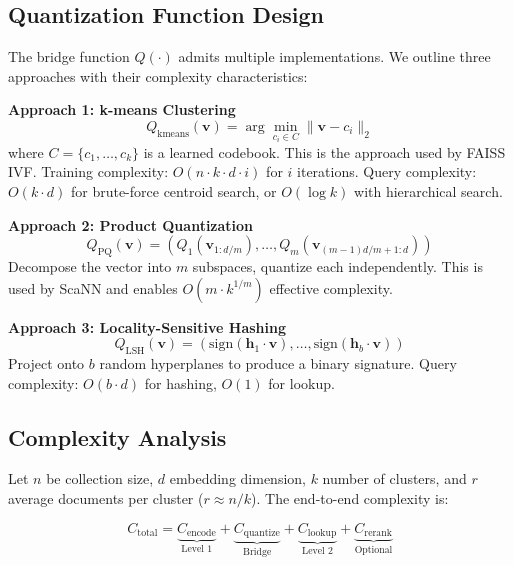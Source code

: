 \documentclass[manuscript,screen,nonacm]{acmart}
\begin{document}
\subsection{Quantization Function Design}

The bridge function $Q(\cdot)$ admits multiple implementations. We outline three approaches with their complexity characteristics:

\textbf{Approach 1: k-means Clustering}
\begin{equation}
Q_{\text{kmeans}}(\mathbf{v}) = \arg\min_{c_i \in C} \|\mathbf{v} - c_i\|_2
\label{eq:kmeans}
\end{equation}
where $C = \{c_1, \ldots, c_k\}$ is a learned codebook. This is the approach used by FAISS IVF. Training complexity: $O(n \cdot k \cdot d \cdot i)$ for $i$ iterations. Query complexity: $O(k \cdot d)$ for brute-force centroid search, or $O(\log k)$ with hierarchical search.

\textbf{Approach 2: Product Quantization}
\begin{equation}
Q_{\text{PQ}}(\mathbf{v}) = (Q_1(\mathbf{v}_{1:d/m}), \ldots, Q_m(\mathbf{v}_{(m-1)d/m+1:d}))
\label{eq:pq}
\end{equation}
Decompose the vector into $m$ subspaces, quantize each independently. This is used by ScaNN and enables $O(m \cdot k^{1/m})$ effective complexity.

\textbf{Approach 3: Locality-Sensitive Hashing}
\begin{equation}
Q_{\text{LSH}}(\mathbf{v}) = (\text{sign}(\mathbf{h}_1 \cdot \mathbf{v}), \ldots, \text{sign}(\mathbf{h}_b \cdot \mathbf{v}))
\label{eq:lsh}
\end{equation}
Project onto $b$ random hyperplanes to produce a binary signature. Query complexity: $O(b \cdot d)$ for hashing, $O(1)$ for lookup.

\subsection{Complexity Analysis}

Let $n$ be collection size, $d$ embedding dimension, $k$ number of clusters, and $r$ average documents per cluster ($r \approx n/k$). The end-to-end complexity is:

\begin{equation}
C_{\text{total}} = \underbrace{C_{\text{encode}}}_{\text{Level 1}} + \underbrace{C_{\text{quantize}}}_{\text{Bridge}} + \underbrace{C_{\text{lookup}}}_{\text{Level 2}} + \underbrace{C_{\text{rerank}}}_{\text{Optional}}
\label{eq:fullcomplexity}
\end{equation}
\end{document}
